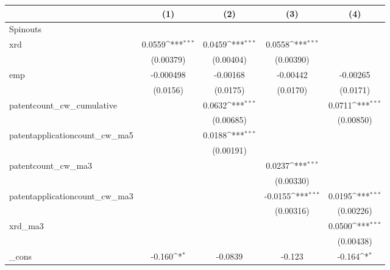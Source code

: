 {
\def\sym#1{\ifmmode^{#1}\else\(^{#1}\)\fi}
\begin{tabular}{l*{4}{c}}
\hline\hline
            &\multicolumn{1}{c}{(1)}         &\multicolumn{1}{c}{(2)}         &\multicolumn{1}{c}{(3)}         &\multicolumn{1}{c}{(4)}         \\
\hline
Spinouts    &                     &                     &                     &                     \\
xrd         &      0.0559\sym{***}&      0.0459\sym{***}&      0.0558\sym{***}&                     \\
            &   (0.00379)         &   (0.00404)         &   (0.00390)         &                     \\
[1em]
emp         &   -0.000498         &    -0.00168         &    -0.00442         &    -0.00265         \\
            &    (0.0156)         &    (0.0175)         &    (0.0170)         &    (0.0171)         \\
[1em]
patentcount\_cw\_cumulative&                     &      0.0632\sym{***}&                     &      0.0711\sym{***}\\
            &                     &   (0.00685)         &                     &   (0.00850)         \\
[1em]
patentapplicationcount\_cw\_ma5&                     &      0.0188\sym{***}&                     &                     \\
            &                     &   (0.00191)         &                     &                     \\
[1em]
patentcount\_cw\_ma3&                     &                     &      0.0237\sym{***}&                     \\
            &                     &                     &   (0.00330)         &                     \\
[1em]
patentapplicationcount\_cw\_ma3&                     &                     &     -0.0155\sym{***}&      0.0195\sym{***}\\
            &                     &                     &   (0.00316)         &   (0.00226)         \\
[1em]
xrd\_ma3     &                     &                     &                     &      0.0500\sym{***}\\
            &                     &                     &                     &   (0.00438)         \\
[1em]
\_cons      &      -0.160\sym{*}  &     -0.0839         &      -0.123         &      -0.164\sym{*}  \\

\end{tabular}}
